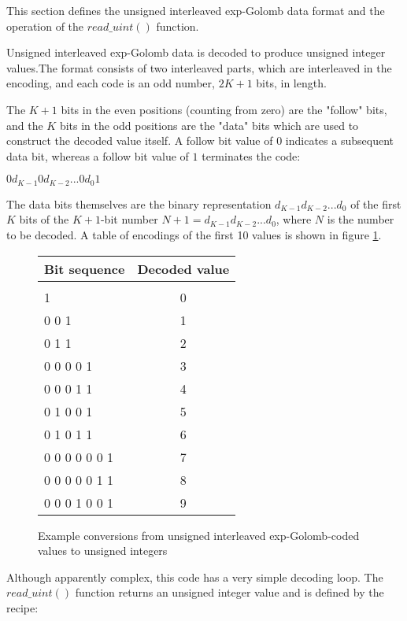This section defines the unsigned interleaved exp-Golomb data format and the operation
of the $read\_uint()$ function. 

Unsigned interleaved exp-Golomb data is decoded to produce unsigned
 integer values.The format consists of two interleaved parts, which are interleaved
in the encoding, and each code is an odd number, $2K+1$ bits, in length.

The $K+1$ bits in the even positions (counting from zero) are the "follow" bits, and 
the $K$ bits in the odd positions are the "data" bits which are used to construct
the decoded value itself. A follow bit value of $0$ indicates a subsequent data bit,
whereas a follow bit value of $1$ terminates the code:

$0 d_{K-1} 0 d_{K-2} ... 0 d_{0} 1$

The data bits themselves are the binary representation 
$d_{K-1} d_{K-2}... d_0$ of the first $K$ bits of the $K+1$-bit number 
$N+1=d_{K-1} d_{K-2}... d_0$, where $N$ is the number to
be decoded. A table of encodings of the first 10 values is shown in figure
\ref{uegolcodings}.

\begin{figure}[h]
\begin{tabular}{l|c}
Bit sequence & Decoded value \\
\hline\\
1                 &  0\\
0 0 1             &  1\\
0 1 1             &  2\\
0 0 0 0 1         &  3\\
0 0 0 1 1         &  4\\
0 1 0 0 1         &  5\\
0 1 0 1 1         &  6\\
0 0 0 0 0 0 1     &  7\\
0 0 0 0 0 1 1     &  8\\
0 0 0 1 0 0 1     &  9\\

\end{tabular}

\caption{Example conversions from unsigned interleaved exp-Golomb-coded 
values to unsigned integers \label{uegolcodings}}
\end{figure}

Although apparently complex, this code has a very simple decoding loop. The 
$read\_uint()$ function returns an unsigned integer value and is defined by the recipe:

